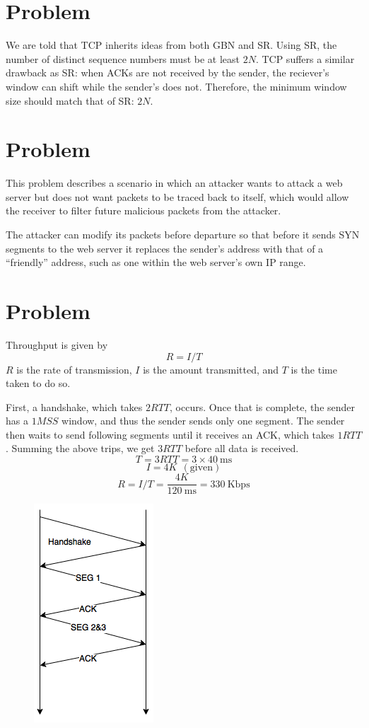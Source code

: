 \documentclass[letterpaper]{article}
\newcommand{\problem}{\section{Problem}}
\begin{document}
\problem{}
We are told that TCP inherits ideas from both GBN and SR. Using SR, the number
of distinct sequence numbers must be at least $2N$. TCP
suffers a similar drawback as SR: when ACKs are not received by the sender,
the reciever's window can shift while the sender's does not. Therefore, the
minimum window size should match that of SR: $2N$.

\problem{}
This problem describes a scenario in which an attacker wants to attack a web
server but does not want packets to be traced back to itself, which would
allow the receiver to filter future malicious packets from the attacker.

The attacker can modify its packets before departure so that before it sends
SYN segments to the web server it replaces the sender's address with that of
a ``friendly'' address, such as one within the web server's own IP range.

\problem{}
Throughput is given by
\begin{equation*}
R = I/T
\end{equation*}
$R$ is the rate of transmission, $I$ is the amount transmitted, and
$T$ is the time taken to do so.

First, a handshake, which takes $2 RTT$, occurs. Once that is complete, the
sender has a $1MSS$ window, and thus the sender sends only one segment. The
sender then waits to send following segments until it receives an ACK, which
takes $1 RTT$. Summing the above trips, we get $3 RTT$ before all data is
received.
\begin{equation*}
T = 3RTT = 3 \times 40\ \mathrm{ms}
\end{equation*}
\begin{equation*}
I = 4K\ \ \mathrm{(given)}
\end{equation*}
\begin{equation*}
R = I/T = \frac{4K}{120\ \mathrm{ms}} = 330\ \mathrm{Kbps}
\end{equation*}
\begin{figure}
\centering
\includegraphics[scale=0.75]{timedia}
\end{figure}
\end{document}
